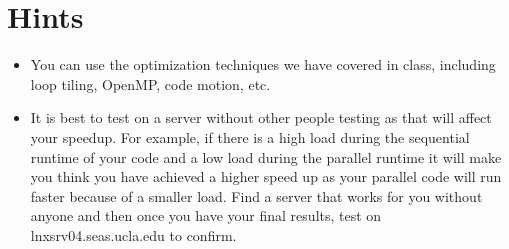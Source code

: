 \documentclass[11pt]{article}
\begin{document}
\vspace{180pt}
\section{Hints}
\begin{itemize}
    \item You can use the optimization techniques we have covered in class, including loop tiling, OpenMP, code motion, etc.
    \item It is best to test on a server without other people testing as that will affect your speedup. For example, if there is a high load during the sequential runtime of your code and a low load during the parallel runtime it will make you think you have achieved a higher speed up as your parallel code will run faster because of a smaller load. Find a server that works for you without anyone and then once you have your final results, test on lnxsrv04.seas.ucla.edu to confirm.
\end{itemize}
\end{document}

